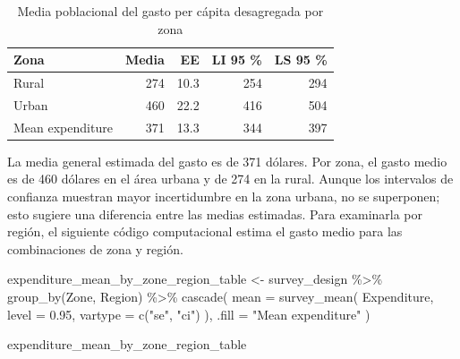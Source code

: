 \documentclass[
  spanish,
  11pt,
  letterpaper,
  oneside,
  open=any]{scrbook}
\newenvironment{Shaded}{\begin{snugshade}}{\end{snugshade}}
\newcommand{\AttributeTok}[1]{\textcolor[rgb]{0.40,0.45,0.13}{#1}}
\newcommand{\FloatTok}[1]{\textcolor[rgb]{0.68,0.00,0.00}{#1}}
\newcommand{\FunctionTok}[1]{\textcolor[rgb]{0.28,0.35,0.67}{#1}}
\newcommand{\NormalTok}[1]{\textcolor[rgb]{0.00,0.23,0.31}{#1}}
\newcommand{\OtherTok}[1]{\textcolor[rgb]{0.00,0.23,0.31}{#1}}
\newcommand{\SpecialCharTok}[1]{\textcolor[rgb]{0.37,0.37,0.37}{#1}}
\newcommand{\StringTok}[1]{\textcolor[rgb]{0.13,0.47,0.30}{#1}}
\begin{document}
{

\begin{longtable}[]{@{}lrrrr@{}}

\caption{\label{tbl-media-gasto-zona}Media poblacional del gasto per
cápita desagregada por zona}

\tabularnewline

\toprule\noalign{}
Zona & Media & EE & LI 95 \% & LS 95 \% \\
\midrule\noalign{}
\endhead
\bottomrule\noalign{}
\endlastfoot
Rural & 274 & 10.3 & 254 & 294 \\
Urban & 460 & 22.2 & 416 & 504 \\
Mean expenditure & 371 & 13.3 & 344 & 397 \\

\end{longtable}

}

La media general estimada del gasto es de 371 dólares. Por zona, el
gasto medio es de 460 dólares en el área urbana y de 274 en la rural.
Aunque los intervalos de confianza muestran mayor incertidumbre en la
zona urbana, no se superponen; esto sugiere una diferencia entre las
medias estimadas. Para examinarla por región, el siguiente código
computacional estima el gasto medio para las combinaciones de zona y
región.

\begin{Shaded}
\begin{Highlighting}[]
\NormalTok{expenditure\_mean\_by\_zone\_region\_table }\OtherTok{\textless{}{-}}\NormalTok{ survey\_design }\SpecialCharTok{\%\textgreater{}\%}
  \FunctionTok{group\_by}\NormalTok{(Zone, Region) }\SpecialCharTok{\%\textgreater{}\%}
  \FunctionTok{cascade}\NormalTok{(}
    \AttributeTok{mean =} \FunctionTok{survey\_mean}\NormalTok{(}
\NormalTok{      Expenditure,}
      \AttributeTok{level =} \FloatTok{0.95}\NormalTok{,}
      \AttributeTok{vartype =} \FunctionTok{c}\NormalTok{(}\StringTok{"se"}\NormalTok{, }\StringTok{"ci"}\NormalTok{)}
\NormalTok{    ),}
    \AttributeTok{.fill =} \StringTok{"Mean expenditure"}
\NormalTok{  )}

\NormalTok{expenditure\_mean\_by\_zone\_region\_table}
\end{Highlighting}
\end{Shaded}
\end{document}
